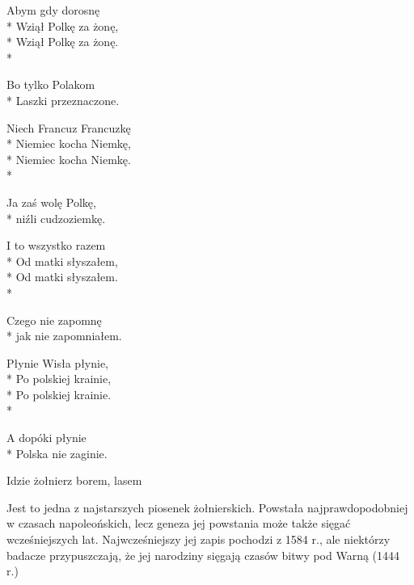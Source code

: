 \begin{lyrics}[multicol=true,longestline={,,Ojcze nasz'' i ,,Zdrowaś''}]
Abym gdy dorosnę\\*
Wziął Polkę za żonę,\\*
Wziął Polkę za żonę.\\*
\begin{markverses}[atwidthof={Zobaczyła Krakówmm}]%
Bo tylko Polakom\\*
Laszki przeznaczone.
\end{markverses}

Niech Francuz Francuzkę\\*
Niemiec kocha Niemkę,\\*
Niemiec kocha Niemkę.\\*
\begin{markverses}[atwidthof={Zobaczyła Krakówmm}]%
Ja zaś wolę Polkę,\\*
niźli cudzoziemkę.
\end{markverses}

I to wszystko razem\\*
Od matki słyszałem,\\*
Od matki słyszałem.\\*
\begin{markverses}[atwidthof={Zobaczyła Krakówmm}]%
Czego nie zapomnę\\*
jak nie zapomniałem.
\end{markverses}

Płynie Wisła płynie,\\*
Po polskiej krainie,\\*
Po polskiej krainie.\\*
\begin{markverses}[atwidthof={Zobaczyła Krakówmm}]%
A dopóki płynie\\*
Polska nie zaginie.
\end{markverses}
\end{lyrics}



\song
{Idzie żołnierz borem, lasem}
\begin{info}Jest to jedna z najstarszych piosenek żołnierskich. Powstała najprawdopodobniej w czasach napoleońskich, lecz geneza jej powstania może także sięgać wcześniejszych lat. Najwcześniejszy jej zapis pochodzi z 1584 r., ale niektórzy badacze przypuszczają, że jej narodziny sięgają czasów bitwy pod Warną (1444 r.)\end{info}

